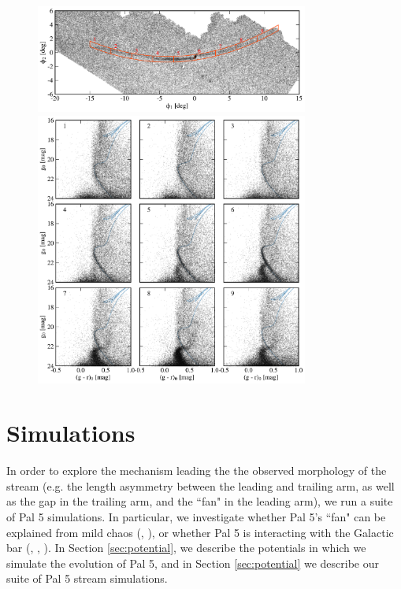 \documentclass[modern]{aastex62}
\begin{document}
\begin{figure}
\begin{center}
\includegraphics[width=0.8\textwidth]{fig1_a_map.pdf}
\includegraphics[width=0.8\textwidth]{fig1_b_cmds.pdf}
\end{center}
\caption{
}
\label{fig:cmds}
\end{figure}

\section{Simulations}
\label{sec:sim}
In order to explore the mechanism leading the the observed morphology of the stream (e.g. the length asymmetry between the leading and trailing arm, as well as the gap in the trailing arm, and the ``fan" in the leading arm), we run a suite of Pal 5 simulations. In particular, we investigate whether Pal 5's ``fan" can be explained from mild chaos  (\citealt{Pearson:2015}, \citealt{Price-Whelan:2016}), or whether Pal 5 is interacting with the Galactic bar (\citealt{Pearson:2017}, \citealt{Erkal:2017}, \citealt{Banik:2019}). In Section \ref{sec:potential}, we describe the potentials in which we simulate the evolution of Pal 5, and in Section \ref{sec:potential} we describe our suite of Pal 5 stream simulations. 
\end{document}
